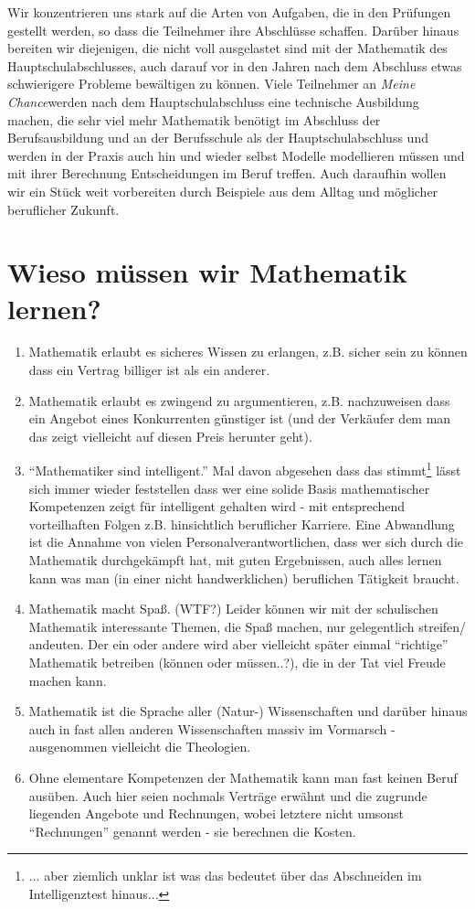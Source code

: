 \documentclass[a4paper]{book}%
\newcommand{\meineChance}{\textit{Meine Chance}\xspace\index{Meine Chance}}
\theoremstyle{definition}
\begin{document}
Wir konzentrieren uns stark auf die Arten von Aufgaben, die in den Prüfungen gestellt werden, so dass die Teilnehmer ihre Abschlüsse schaffen. Darüber hinaus bereiten wir diejenigen, die nicht voll ausgelastet sind mit der Mathematik des Hauptschulabschlusses, auch darauf vor in den Jahren nach dem Abschluss etwas schwierigere Probleme bewältigen zu können. Viele Teilnehmer an \meineChance werden nach dem Hauptschulabschluss eine technische Ausbildung machen, die sehr viel mehr Mathematik benötigt im Abschluss der Berufsausbildung und an der Berufsschule als der Hauptschulabschluss und werden in der Praxis auch hin und wieder selbst Modelle modellieren müssen und mit ihrer Berechnung Entscheidungen im Beruf treffen. Auch daraufhin wollen wir ein Stück weit vorbereiten durch Beispiele aus dem Alltag und möglicher beruflicher Zukunft.


\section{Wieso müssen wir Mathematik lernen?}\label{MathematikWieso}

\begin{enumerate}
  \item Mathematik erlaubt es sicheres Wissen zu erlangen, z.B. sicher sein zu können dass ein Vertrag billiger ist als ein anderer.
  \item Mathematik erlaubt es zwingend zu argumentieren, z.B. nachzuweisen dass ein Angebot eines Konkurrenten günstiger ist (und der Verkäufer dem man das zeigt vielleicht auf diesen Preis herunter geht).
  \item \enquote{Mathematiker sind intelligent.} Mal davon abgesehen dass das stimmt\footnote{... aber ziemlich unklar ist was das bedeutet über das Abschneiden im Intelligenztest hinaus...} lässt sich immer wieder feststellen dass wer eine solide Basis mathematischer Kompetenzen zeigt für intelligent gehalten wird - mit entsprechend vorteilhaften Folgen z.B. hinsichtlich beruflicher Karriere. Eine Abwandlung ist die Annahme von vielen Personalverantwortlichen, dass wer sich durch die Mathematik durchgekämpft hat, mit guten Ergebnissen, auch alles lernen kann was man (in einer nicht handwerklichen) beruflichen Tätigkeit braucht.
  \item Mathematik macht Spaß. (WTF?) Leider können wir mit der schulischen Mathematik interessante Themen, die Spaß machen, nur gelegentlich streifen/ andeuten. Der ein oder andere wird aber vielleicht später einmal \enquote{richtige} Mathematik betreiben (können oder müssen..?), die in der Tat viel Freude machen kann.
  \item Mathematik ist die Sprache aller (Natur-) Wissenschaften und darüber hinaus auch in fast allen anderen Wissenschaften massiv im Vormarsch - ausgenommen vielleicht die Theologien.
  \item Ohne elementare Kompetenzen der Mathematik kann man fast keinen Beruf ausüben. Auch hier seien nochmals Verträge erwähnt und die zugrunde liegenden Angebote und Rechnungen, wobei letztere nicht umsonst \enquote{Rechnungen} genannt werden - sie berechnen die Kosten.
\end{enumerate}
\end{document}
